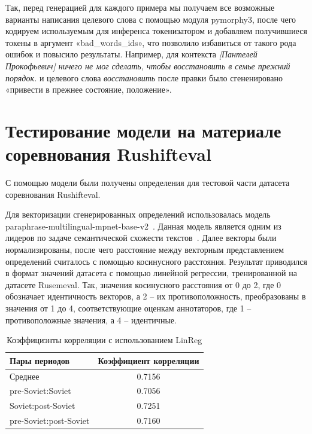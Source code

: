 \documentclass[LI,VKR]{HSEUniversity}
\begin{document}
Так, перед генерацией для каждого примера мы получаем все возможные
варианты написания целевого слова с помощью модуля pymorphy3,
после чего кодируем используемым для инференса токенизатором и добавляем
получившиеся токены в аргумент «bad\_words\_ids»,
что позволило избавиться от такого рода ошибок и повысило результаты.
Например, для контекста \textit{[Пантелей Прокофьевич] ничего не мог сделать, чтобы восстановить в семье прежний порядок.}
и целевого слова \textit{восстановить} после правки было сгененировано
«привести в прежнее состояние, положение».

\section{Тестирование модели на материале соревнования Rushifteval}

С помощью модели были получены определения для тестовой части датасета соревнования Rushifteval.

Для векторизации сгенерированных определений использовалась модель paraphrase-multilingual-mpnet-base-v2~.
Данная модель является одним из лидеров по задаче семантической схожести текстов~.
Далее векторы были нормализированы, после чего расстояние между
векторным представлением определений считалось с помощью косинусного расстояния.
Результат приводился в формат значений датасета с помощью линейной регрессии,
тренированной на датасете Rusemeval.
Так, значения косинусного расстояния от 0 до 2, где 0 обозначает идентичность векторов,
а 2 – их противоположность, преобразованы в значения от 1 до 4,
соответствующие оценкам аннотаторов, где 1 – противоположные значения, а 4 – идентичные.

\begin{table}[H]
\centering
\caption{Коэффициэнты корреляции с использованием LinReg}
\begin{tabular}{lc}
\hline
Пары периодов                  & Коэффициент корреляции \\
\hline
Среднее            & 0.7156                  \\
pre-Soviet:Soviet           & 0.7056                  \\
Soviet:post-Soviet          & 0.7251                  \\
pre-Soviet:post-Soviet      & 0.7160                  \\
\hline
\end{tabular}
\end{table}
\end{document}
